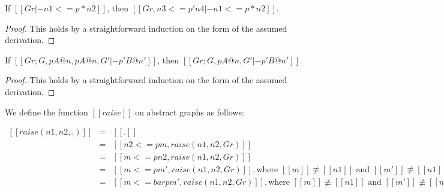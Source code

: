 \begin{lemma}
  \label{lemma:graph_weakening}
  If $[[Gr |- n1 <= p * n2]]$, then $[[Gr, n3 <= p' n4 |- n1 <= p * n2]]$.
\end{lemma}
  \begin{proof}
    This holds by a straightforward induction on the form of the assumed derivation.
  \end{proof}

\begin{lemma}[Contraction]
  \label{lemma:contract}
  If $[[Gr ; G , p A @ n , p A @ n , G' |- p' B @ n']]$, then
  $[[Gr ; G , p A @ n , G' |- p' B @ n']]$.
\end{lemma}
  \begin{proof}
    This holds by a straightforward induction on the form of the assumed derivation.
  \end{proof}
  
\begin{definition}
  \label{def:raise}
  We define the function $[[raise]]$ on abstract graphs as follows:
  \begin{center}
    \begin{math}
      \begin{array}{lll}
        [[raise ( n1 , n2 , . )]] & = & [[.]]\\
        [[raise ( n1 , n2 , (n1 <=p  m, Gr))]] & = & [[n2 <=p m , raise (n1 , n2, Gr)]]\\
        [[raise ( n1 , n2 , ( m <=p n1, Gr))]] & = & [[m <= p n2 , raise (n1 , n2, Gr)]]\\
        [[raise ( n1 , n2 , (m <=p m' , Gr ))]] & = & [[m <=  p m' , raise (n1 , n2, Gr)]], 
        \text{where } [[m]] \not\equiv [[n1]] \text{ and } [[m']] \not\equiv [[n1]].\\
        [[raise ( n1 , n2 , (m <=bar p m' , Gr ))]] & = &[[m <=  bar p m' , raise (n1 , n2, Gr)]],
        \text{where } [[m]] \not\equiv [[n1]] \text{ and } [[m']] \not\equiv [[n1]].\\
      \end{array}
    \end{math}
  \end{center}
\end{definition}

